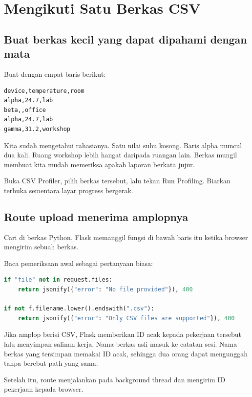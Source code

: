 \chapter{Mengikuti Satu Berkas CSV}

\section{Buat berkas kecil yang dapat dipahami dengan mata}

Buat  dengan empat baris berikut:

\begin{lstlisting}[numbers=none]
device,temperature,room
alpha,24.7,lab
beta,,office
alpha,24.7,lab
gamma,31.2,workshop
\end{lstlisting}

Kita sudah mengetahui rahasianya. Satu nilai suhu kosong. Baris alpha muncul dua kali. Ruang workshop lebih hangat daripada ruangan lain. Berkas mungil membuat kita mudah memeriksa apakah laporan berkata jujur.

Buka CSV Profiler, pilih berkas tersebut, lalu tekan Run Profiling. Biarkan  terbuka sementara layar progress bergerak.

\section{Route upload menerima amplopnya}

Cari  di berkas Python. Flask memanggil fungsi di bawah baris itu ketika browser mengirim sebuah berkas.

Baca pemeriksaan awal sebagai pertanyaan biasa:

\begin{lstlisting}[language=Python]
if "file" not in request.files:
    return jsonify({"error": "No file provided"}), 400

if not f.filename.lower().endswith(".csv"):
    return jsonify({"error": "Only CSV files are supported"}), 400
\end{lstlisting}

Jika amplop berisi CSV, Flask memberikan ID acak kepada pekerjaan tersebut lalu menyimpan salinan kerja. Nama berkas asli masuk ke catatan sesi. Nama berkas yang tersimpan memakai ID acak, sehingga dua orang dapat mengunggah  tanpa berebut path yang sama.

Setelah itu, route menjalankan  pada background thread dan mengirim ID pekerjaan kepada browser.

